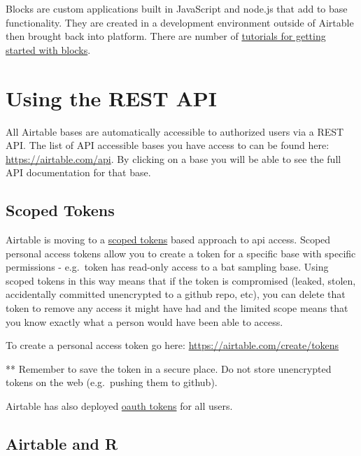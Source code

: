 \documentclass[
]{book}
\begin{document}
Blocks are custom applications built in JavaScript and node.js that add to base functionality. They are created in a development environment outside of Airtable then brought back into platform. There are number of \href{https://www.airtable.com/developers/apps/guides/getting-started}{tutorials for getting started with blocks}.

\hypertarget{using-the-rest-api}{%
\section{Using the REST API}\label{using-the-rest-api}}

All Airtable bases are automatically accessible to authorized users via a REST API. The list of API accessible bases you have access to can be found here: \url{https://airtable.com/api}. By clicking on a base you will be able to see the full API documentation for that base.

\hypertarget{scoped-tokens}{%
\subsection{Scoped Tokens}\label{scoped-tokens}}

Airtable is moving to a \href{https://airtable.com/developers/web/guides/personal-access-tokens}{scoped tokens} based approach to api access. Scoped personal access tokens allow you to create a token for a specific base with specific permissions - e.g.~token has read-only access to a bat sampling base. Using scoped tokens in this way means that if the token is compromised (leaked, stolen, accidentally committed unencrypted to a github repo, etc), you can delete that token to remove any access it might have had and the limited scope means that you know exactly what a person would have been able to access.

To create a personal access token go here: \url{https://airtable.com/create/tokens}

** Remember to save the token in a secure place. Do not store unencrypted tokens on the web (e.g.~pushing them to github).

Airtable has also deployed \href{https://airtable.com/developers/web/api/oauth-reference}{oauth tokens} for all users.

\hypertarget{airtable-and-r}{%
\subsection{Airtable and R}\label{airtable-and-r}}
\end{document}
